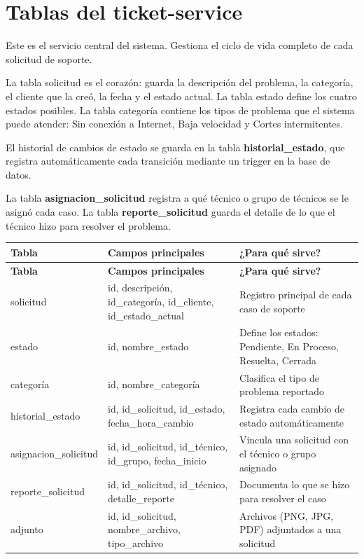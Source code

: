 \documentclass[12pt, a4paper]{report}
\begin{document}
\section{Tablas del ticket-service}

Este es el servicio central del sistema. Gestiona el ciclo de vida
completo de cada solicitud de soporte.

La tabla solicitud es el corazón: guarda la descripción del
problema, la categoría, el cliente que la creó, la fecha y el estado
actual. La tabla estado define los cuatro estados posibles.
La tabla categoría contiene los tipos de problema que el
sistema puede atender: Sin conexión a Internet, Baja velocidad
y Cortes intermitentes.

El historial de cambios de estado se guarda en la tabla
\textbf{historial\_estado}, que registra automáticamente cada
transición mediante un trigger en la base de datos.

La tabla \textbf{asignacion\_solicitud} registra a qué técnico
o grupo de técnicos se le asignó cada caso. La tabla
\textbf{reporte\_solicitud} guarda el detalle de lo que el técnico
hizo para resolver el problema.

\begin{longtable}{|p{4cm}|p{4cm}|p{4.5cm}|}
\hline
\textbf{Tabla} & \textbf{Campos principales} & \textbf{¿Para qué sirve?} \\
\hline
\endfirsthead
\hline
\textbf{Tabla} & \textbf{Campos principales} & \textbf{¿Para qué sirve?} \\
\hline
\endhead
solicitud &
id, descripción, id\_categoría, id\_cliente, id\_estado\_actual &
Registro principal de cada caso de soporte \\
\hline
estado &
id, nombre\_estado &
Define los estados: Pendiente, En Proceso, Resuelta, Cerrada \\
\hline
categoría &
id, nombre\_categoría &
Clasifica el tipo de problema reportado \\
\hline
historial\_estado &
id, id\_solicitud, id\_estado, fecha\_hora\_cambio &
Registra cada cambio de estado automáticamente \\
\hline
asignacion\_solicitud &
id, id\_solicitud, id\_técnico, id\_grupo, fecha\_inicio &
Vincula una solicitud con el técnico o grupo asignado \\
\hline
reporte\_solicitud &
id, id\_solicitud, id\_técnico, detalle\_reporte &
Documenta lo que se hizo para resolver el caso \\
\hline
adjunto &
id, id\_solicitud, nombre\_archivo, tipo\_archivo &
Archivos (PNG, JPG, PDF) adjuntados a una solicitud \\
\hline
\end{longtable}
\end{document}
